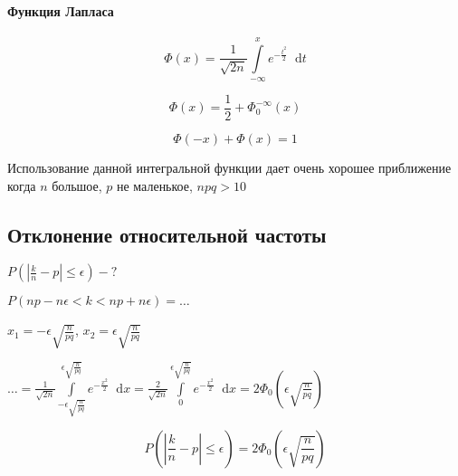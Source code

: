 \documentclass{article}
\newcommand*\diff{\mathop{}\!\mathrm{d}}
\begin{document}
\paragraph{Функция Лапласа}

$$
\Phi(x) = \frac{1}{\sqrt{2n}} \int\limits_{-\infty}^{x} e^{-\frac{t^2}{2}} \diff t
$$

$$
\Phi(x) = \frac{1}{2} + \Phi_{0}^{-\infty}(x)
$$

$$
\Phi(-x) + \Phi(x) = 1
$$

Использование данной интегральной функции дает очень хорошее приближение когда $n$ большое, $p$ не маленькое, $npq > 10$

\subsection{Отклонение относительной частоты}

$P(|\frac{k}{n} - p| \le \epsilon) - ?$

$P(np - n \epsilon < k < np + n \epsilon) = \dots$

$x_1 = -\epsilon \sqrt{\frac{n}{pq}}$, $x_2 = \epsilon \sqrt{\frac{n}{pq}}$

$\dots = \frac{1}{\sqrt{2 n}} \int\limits_{-\epsilon \sqrt{\frac{n}{pq}}}^{\epsilon \sqrt{\frac{n}{pq}}} e^{-\frac{x^2}{2}} \diff x = \frac{2}{\sqrt{2n}} \int\limits_{0}^{\epsilon \sqrt{\frac{n}{pq}}} e^{-\frac{x^2}{2}} \diff x = 2 \Phi_0 (\epsilon \sqrt{\frac{n}{pq}})$

$$
P(|\frac{k}{n} - p| \le \epsilon) = 2 \Phi_0 (\epsilon \sqrt{\frac{n}{pq}})
$$
\end{document}
